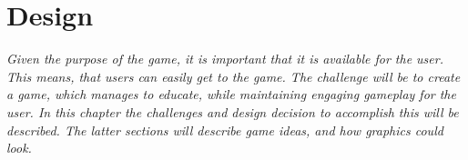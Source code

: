 \chapter{Design}
\label{cha:design}

\textit{Given the purpose of the game, it is important that it is available for the user.
This means, that users can easily get to the game.
The challenge will be to create a game, which manages to educate, while maintaining engaging gameplay for the user.
In this chapter the challenges and design decision to accomplish this will be described. The latter sections will describe game ideas, and how graphics could look.}\newpage






